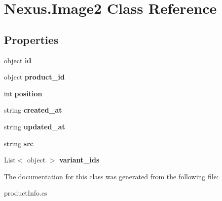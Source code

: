 \hypertarget{class_nexus_1_1_image2}{}\section{Nexus.\+Image2 Class Reference}
\label{class_nexus_1_1_image2}
\subsection*{Properties}
\begin{DoxyCompactItemize}
\item 
\mbox{\label{class_nexus_1_1_image2_a253120be9c0f82a752dbb45fbd5fa76e}} 
object {\bfseries id}
\item 
\mbox{\label{class_nexus_1_1_image2_abc8dbc2ba57da473b563a06f29efb0cf}} 
object {\bfseries product\+\_\+id}
\item 
\mbox{\label{class_nexus_1_1_image2_a4d91a00cb5e689b1c884bd84af141c6d}} 
int {\bfseries position}
\item 
\mbox{\label{class_nexus_1_1_image2_af5bdc2b5f321084f4bd88f68b2d6688f}} 
string {\bfseries created\+\_\+at}
\item 
\mbox{\label{class_nexus_1_1_image2_a714a0542e7ce9a661aab419374255154}} 
string {\bfseries updated\+\_\+at}
\item 
\mbox{\label{class_nexus_1_1_image2_a733f71273d4b9a0e9e0831bfb7830034}} 
string {\bfseries src}
\item 
\mbox{\label{class_nexus_1_1_image2_ad1a6f5f1917d606d79fb5b8493f8f177}} 
List$<$ object $>$ {\bfseries variant\+\_\+ids}
\end{DoxyCompactItemize}


The documentation for this class was generated from the following file\+:\begin{DoxyCompactItemize}
\item 
product\+Info.\+cs\end{DoxyCompactItemize}
